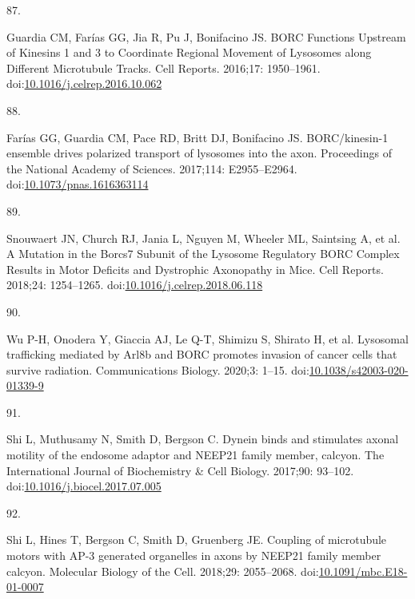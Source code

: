 \documentclass[
  12pt,
  a4paper,
]{book}
\newlength{\cslhangindent}
\newlength{\csllabelwidth}
\newlength{\cslentryspacingunit} %
\newenvironment{CSLReferences}[2] %
 {%
  \setlength{\parindent}{0pt}
  \ifodd #1
  \let\oldpar\par
  \def\par{\hangindent=\cslhangindent\oldpar}
  \fi
  \setlength{\parskip}{#2\cslentryspacingunit}
 }%
 {}
\newcommand{\CSLLeftMargin}[1]{\parbox[t]{\csllabelwidth}{#1}}
\newcommand{\CSLRightInline}[1]{\parbox[t]{\linewidth - \csllabelwidth}{#1}\break}
\begin{document}
\begin{CSLReferences}{0}{0}
\leavevmode{}%
\CSLLeftMargin{87. }%
\CSLRightInline{Guardia CM, Farías GG, Jia R, Pu J, Bonifacino JS. {BORC Functions Upstream} of {Kinesins} 1 and 3 to {Coordinate Regional Movement} of {Lysosomes} along {Different Microtubule Tracks}. Cell Reports. 2016;17: 1950--1961. doi:\href{https://doi.org/10.1016/j.celrep.2016.10.062}{10.1016/j.celrep.2016.10.062}}

\leavevmode{}%
\CSLLeftMargin{88. }%
\CSLRightInline{Farías GG, Guardia CM, Pace RD, Britt DJ, Bonifacino JS. {BORC}/kinesin-1 ensemble drives polarized transport of lysosomes into the axon. Proceedings of the National Academy of Sciences. 2017;114: E2955--E2964. doi:\href{https://doi.org/10.1073/pnas.1616363114}{10.1073/pnas.1616363114}}

\leavevmode{}%
\CSLLeftMargin{89. }%
\CSLRightInline{Snouwaert JN, Church RJ, Jania L, Nguyen M, Wheeler ML, Saintsing A, et al. A {Mutation} in the {Borcs7 Subunit} of the {Lysosome Regulatory BORC Complex Results} in {Motor Deficits} and {Dystrophic Axonopathy} in {Mice}. Cell Reports. 2018;24: 1254--1265. doi:\href{https://doi.org/10.1016/j.celrep.2018.06.118}{10.1016/j.celrep.2018.06.118}}

\leavevmode{}%
\CSLLeftMargin{90. }%
\CSLRightInline{Wu P-H, Onodera Y, Giaccia AJ, Le Q-T, Shimizu S, Shirato H, et al. Lysosomal trafficking mediated by {Arl8b} and {BORC} promotes invasion of cancer cells that survive radiation. Communications Biology. 2020;3: 1--15. doi:\href{https://doi.org/10.1038/s42003-020-01339-9}{10.1038/s42003-020-01339-9}}

\leavevmode{}%
\CSLLeftMargin{91. }%
\CSLRightInline{Shi L, Muthusamy N, Smith D, Bergson C. Dynein binds and stimulates axonal motility of the endosome adaptor and {NEEP21} family member, calcyon. The International Journal of Biochemistry \& Cell Biology. 2017;90: 93--102. doi:\href{https://doi.org/10.1016/j.biocel.2017.07.005}{10.1016/j.biocel.2017.07.005}}

\leavevmode{}%
\CSLLeftMargin{92. }%
\CSLRightInline{Shi L, Hines T, Bergson C, Smith D, Gruenberg JE. Coupling of microtubule motors with {AP-3} generated organelles in axons by {NEEP21} family member calcyon. Molecular Biology of the Cell. 2018;29: 2055--2068. doi:\href{https://doi.org/10.1091/mbc.E18-01-0007}{10.1091/mbc.E18-01-0007}}


\end{CSLReferences}
\end{document}
